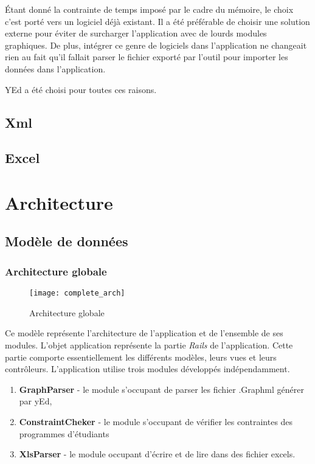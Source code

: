 Étant donné la contrainte de temps imposé par le cadre du mémoire, le choix c'est porté vers un logiciel déjà existant. Il a été préférable de choisir une solution externe pour éviter de surcharger l'application avec de lourds modules graphiques. De plus, intégrer ce genre de logiciels dans l'application ne changeait rien au fait qu'il fallait parser le fichier exporté par l'outil pour importer les données dans l'application.

YEd a été choisi pour toutes ces raisons. 
\subsection{Xml}

\subsection{Excel}
\clearpage
\section{Architecture}
\subsection{Modèle de données}

\subsubsection{Architecture globale}

\begin{figure}[H]
\caption{Architecture globale}
\centering
\label{fig:complete_arch}
\texttt{[image: complete\_arch]}
\end{figure}

Ce modèle représente l'architecture de l'application et de l'ensemble de ses modules. L'objet application représente la partie \textit{Rails} de l'application. Cette partie comporte essentiellement les différents modèles, leurs vues et leurs contrôleurs. L'application utilise trois modules développés indépendamment.
\begin{enumerate}
  \item \textbf{GraphParser} - le module s'occupant de parser les fichier .Graphml générer par yEd, 
  \item \textbf{ConstraintCheker} - le module s'occupant de vérifier les contraintes des programmes d'étudiants
  \item \textbf{XlsParser} - le module occupant d'écrire et de lire dans des fichier excels. 
\end{enumerate}

